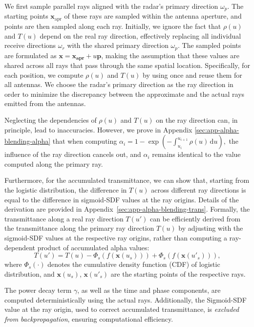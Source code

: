 We first sample parallel rays aligned with the radar's primary direction \( \omega_p \).
The starting points \( \mathbf{x}_{\text{apr}} \) of these rays are sampled within the antenna aperture, and points are then sampled along each ray.
Initially, we ignore the fact that \( \rho(u) \) and \( T(u) \) depend on the real ray direction, effectively replacing all individual receive directions \( \omega_r \) with the shared primary direction \( \omega_p \).
The sampled points are formulated as $\mathbf{x}=\mathbf{x_{apr}}+u\mathbf{p}$, making the assumption that these values are shared across all rays that pass through the same spatial location.
Specifically, for each position, we compute \( \rho(u) \) and \( T(u) \) by using \cite{wang2021neus} once and reuse them for all antennas.
We choose the radar’s primary direction as the ray direction in order to minimize the discrepancy between the approximate and the actual rays emitted from the antennas.



\label{sec:lenslessapprox}
Neglecting the dependencies of \( \rho(u) \) and \( T(u) \) on the ray direction can, in principle, lead to inaccuracies.
However, we prove in Appendix \ref{sec:app-alpha-blending-alpha} that when computing
\(
\alpha_i = 1 - \exp\left(-\int_{u_i}^{u_{i+1}} \rho(u) \, \mathrm{d}u\right),
\)
the influence of the ray direction cancels out, and \( \alpha_i \) remains identical to the value computed along the primary ray.

Furthermore, for the accumulated transmittance, we can show that, starting from the logistic distribution, the difference in \( T(u) \) across different ray directions is equal to the difference in sigmoid-SDF values at the ray origins.  Details of the derivation are provided in Appendix~\ref{sec:app-alpha-blending-trans}.
Formally, the transmittance along a real ray direction \( T(u') \) can be efficiently derived from the transmittance along the primary ray direction \( T(u) \) by adjusting with the sigmoid-SDF values at the respective ray origins, rather than computing a ray-dependent product of accumulated alpha values:
\begin{equation}
\label{eq:lens-less-transmittance}
    T(u') = T(u) - \Phi_s(f(\mathbf{x}(u_s))) + \Phi_s(f(\mathbf{x}(u'_s))),
\end{equation}
where \( \Phi_s(\cdot) \) denotes the cumulative density function (CDF) of logistic distribution, and \( \mathbf{x}(u_s) \), \( \mathbf{x}(u'_s) \) are the starting points of the respective rays.

The power decay term \( \gamma \), as well as the time and phase components, are computed deterministically using the actual rays.
Additionally, the Sigmoid-SDF value at the ray origin, used to correct accumulated transmittance, is \textit{excluded from backpropagation}, ensuring computational efficiency.

